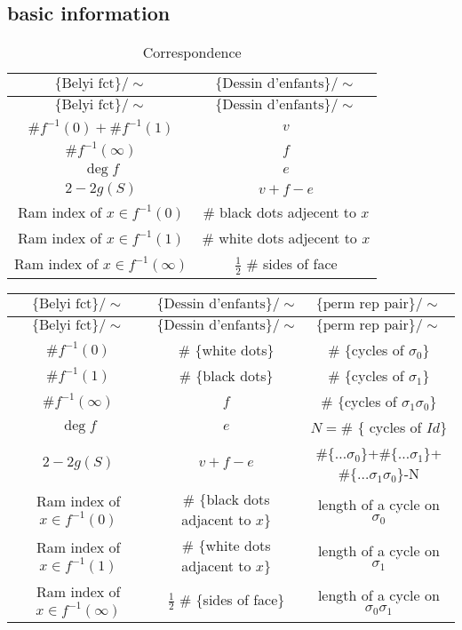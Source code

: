 \documentclass[reqno,11pt]{amsart}
\numberwithin{equation}{section}
\theoremstyle{plain}
\theoremstyle{plain}
\numberwithin{equation}{section}
\theoremstyle{remark}
\begin{document}
\subsection{basic information}
	\begin{longtable}{c|c}
	\hline
	$\{\text{Belyi fct}\}/\sim$ & $\{\text{Dessin d'enfants}\}/\sim$	\\
	
	\hline
	\endhead
	\hline
	$\{\text{Belyi fct}\}/\sim$ & $\{\text{Dessin d'enfants}\}/\sim$	\\
	
	\hline
	\endfirsthead	
	\hline
	\endfoot
	\hline		
	\caption{Correspondence}
	\endlastfoot
	
	$\# f^{-1}(0) + \# f^{-1}(1)$ & $v$\\
	$\# f^{-1}(\infty)$ & $f$ \\
	$\deg f$ & $e$\\
	$2-2g(S)$ & $v+f-e$\\
	Ram index of $x \in f^{-1}(0)$ & $\#$ black dots adjecent to $x$\\
	Ram index of $x \in f^{-1}(1)$ & $\#$ white dots adjecent to $x$\\
	Ram index of $x \in f^{-1}(\infty)$ & $\frac{1}{2}$ $\#$ sides of face\\
	
	
	
	\hline								
\end{longtable}
\newpage
\begin{longtable}{c|c|c}
	\hline
	$\{\text{Belyi fct}\}/\sim$ & $\{\text{Dessin d'enfants}\}/\sim$	& $\{\text{perm rep pair}\}/\sim $\\
	
	\hline
	\endhead
	\hline
	$\{\text{Belyi fct}\}/\sim$ & $\{\text{Dessin d'enfants}\}/\sim$	& $\{\text{perm rep pair}\}/\sim $\\
	
	\hline
	\endfirsthead	
	\hline
	\endfoot
	\hline		
	\endlastfoot
	
	$\# f^{-1}(0) $ & $\#$ $\{$white dots$\}$ &$\#$ $\{$cycles of  $\sigma_0\}$\\
	$ \# f^{-1}(1)  $ & $\#$ $\{$black dots$\}$&$\#$ $\{$cycles of  $\sigma_1\}$\\
	$\# f^{-1}(\infty)$ & $f$ &$\#$ $\{$cycles of  $\sigma_1\sigma_0\}$\\
	$\deg f$ & $e$ & $N=\#$ $\{$ cycles of  $Id\}$\\
	$2-2g(S)$ & $v+f-e$ & $\#\{\ldots \sigma_0\}$+$\#\{\ldots \sigma_1\}$+$\#\{\ldots \sigma_1\sigma_0\}$-N\\
	Ram index of $x \in f^{-1}(0)$ & $\#$ $\{$black dots adjacent to $x\}$ & length of a cycle on $\sigma_0$\\
	Ram index of $x \in f^{-1}(1)$ & $\#$ $\{$white dots adjacent to $x\}$ & length of a cycle on $\sigma_1$\\
	Ram index of $x \in f^{-1}(\infty)$ & $\frac{1}{2}$ $\#$ $\{$sides of face$\}$ & length of a cycle on $\sigma_0\sigma_1$\\
	\hline
	
\end{longtable}
\end{document}
